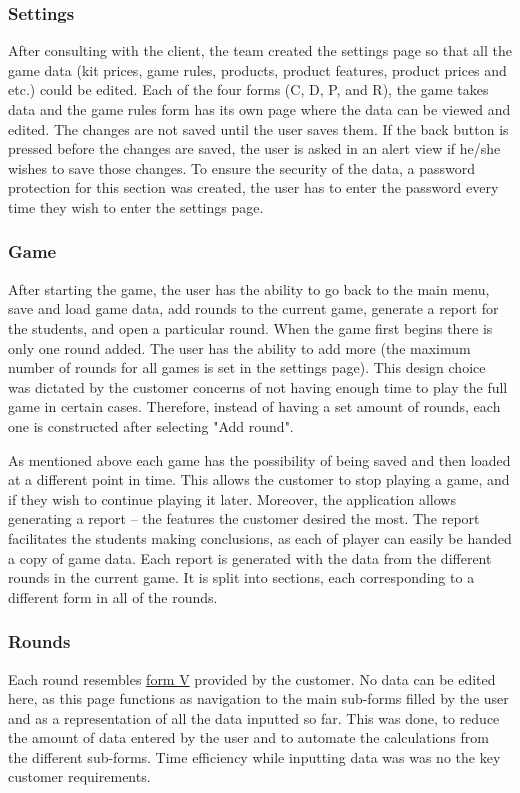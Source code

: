 \documentclass{l3proj}
\begin{document}
\subsubsection{Settings}
After consulting with the client, the team created the settings page so that all the game data (kit prices, game rules, products, product features, product prices and etc.) could be edited. Each of the four forms (C, D, P, and R), the game takes data and the game rules form has its own page where the data can be viewed and edited. The changes are not saved until the user saves them. If the back button is pressed before the changes are saved, the user is asked in an alert view if he/she wishes to save those changes. To ensure the security of the data, a password protection for this section was created, the user has to enter the password every time they wish to enter the settings page.


\subsubsection{Game}
After starting the game, the user has the ability to go back to the main menu, save and load game data, add rounds to the current game, generate a report for the students, and open a particular round. When the game first begins there is only one round added. The user has the ability to add more (the maximum number of rounds for all games is set in the settings page). This design choice was dictated by the customer concerns of not having enough time to play the full game in certain cases. Therefore, instead of having a set amount of rounds, each one is constructed after selecting "Add round".

As mentioned above each game has the possibility of being saved and then loaded at a different point in time. This allows the customer to stop playing a game, and if they wish to continue playing it later. Moreover, the application allows generating a report -- the features the customer desired the most. The report facilitates the students making conclusions, as each of player can easily be handed a copy of game data. Each report is generated with the data from the different rounds in the current game. It is split into sections, each corresponding to a different form in all of the rounds.


\subsubsection{Rounds}
Each round resembles \hyperref[fig:FormV]{form V} provided by the customer. No data can be edited here, as this page functions as navigation to the main sub-forms filled by the user and as a representation of all the data inputted so far. This was done, to reduce the amount of data entered by the user and to automate the calculations from the different sub-forms. Time efficiency while inputting data was was no the key customer requirements.
\end{document}
